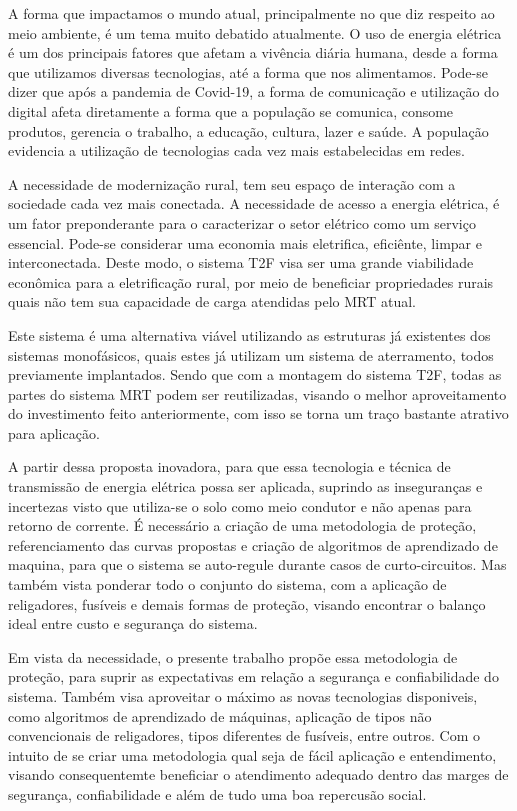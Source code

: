\documentclass[oneside,openright,12pt]{ufsm_2021} %
\begin{document}
\par A forma que impactamos o mundo atual, principalmente no que diz respeito ao meio ambiente, é um tema muito debatido atualmente. O uso de energia elétrica é um dos principais fatores que afetam a vivência diária humana, desde a forma que utilizamos diversas tecnologias, até a forma que nos alimentamos. Pode-se dizer que após a pandemia de Covid-19, a forma de comunicação e utilização do digital afeta diretamente a forma que a população se comunica, consome produtos, gerencia o trabalho, a educação, cultura, lazer e saúde. A população evidencia a utilização de tecnologias cada vez mais estabelecidas em redes.

\par A necessidade de modernização rural, tem seu espaço de interação com a sociedade cada vez mais conectada. A necessidade de acesso a energia elétrica, é um fator preponderante para o caracterizar o setor elétrico como um serviço essencial. Pode-se considerar uma economia mais eletrifica, eficiênte, limpar e interconectada. Deste modo, o sistema T2F visa ser uma grande viabilidade econômica para a eletrificação rural, por meio de beneficiar propriedades rurais quais não tem sua capacidade de carga atendidas pelo MRT atual. 

\par Este sistema é uma alternativa viável utilizando as estruturas já existentes dos sistemas monofásicos, quais estes já utilizam um sistema de aterramento, todos previamente implantados. Sendo que com a montagem do sistema T2F, todas as partes do sistema MRT podem ser reutilizadas, visando o melhor aproveitamento do investimento feito anteriormente, com isso se torna um traço bastante atrativo para aplicação.

\par A partir dessa proposta inovadora, para que essa tecnologia e técnica de transmissão de energia elétrica possa ser aplicada, suprindo as inseguranças e incertezas visto que utiliza-se o solo como meio condutor e não apenas para retorno de corrente. É necessário a criação de uma metodologia de proteção, referenciamento das curvas propostas e criação de algoritmos de aprendizado de maquina, para que o sistema se auto-regule durante casos de curto-circuitos. Mas também vista ponderar todo o conjunto do sistema, com a aplicação de religadores, fusíveis e demais formas de proteção, visando encontrar o balanço ideal entre custo e segurança do sistema.

\par Em vista da necessidade, o presente trabalho propõe essa metodologia de proteção, para suprir as expectativas em relação a segurança e confiabilidade do sistema. Também visa aproveitar o máximo as novas tecnologias disponiveis, como algoritmos de aprendizado de máquinas, aplicação de tipos não convencionais de religadores, tipos diferentes de fusíveis, entre outros. Com o intuito de se criar uma metodologia qual seja de fácil aplicação e entendimento, visando consequentemte beneficiar o atendimento adequado dentro das marges de segurança, confiabilidade e além de tudo uma boa repercusão social.
\end{document}
